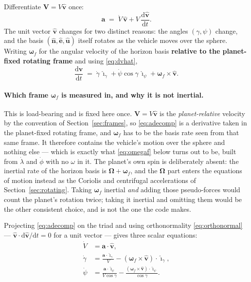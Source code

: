 \documentclass[11pt]{article}
\newcommand{\vhat}{\hat{\mathbf{v}}}
\newcommand{\ig}{\hat{\boldsymbol{\imath}}_{\gamma}}
\newcommand{\ip}{\hat{\boldsymbol{\imath}}_{\psi}}
\newcommand{\nhat}{\hat{\mathbf{n}}}
\newcommand{\ehat}{\hat{\mathbf{e}}}
\newcommand{\uhat}{\hat{\mathbf{u}}}
\newcommand{\bomega}{\boldsymbol{\omega}}
\newcommand{\bOmega}{\boldsymbol{\Omega}}
\newcommand{\dd}{\mathrm{d}}
\begin{document}
Differentiate $\mathbf{V}=V\vhat$ once:
\begin{equation}
  \mathbf{a} \;=\; \dot V\,\vhat + V\,\frac{\dd\vhat}{\dd t} .
  \label{eq:adecomp}
\end{equation}
The unit vector $\vhat$ changes for two distinct reasons: the angles
$(\gamma,\psi)$ change, and the basis $(\nhat,\ehat,\uhat)$ itself rotates as
the vehicle moves over the sphere. Writing $\bomega_f$ for the angular velocity
of the horizon basis \textbf{relative to the planet-fixed rotating frame} and
using \eqref{eq:dvhat},
\begin{equation}
  \frac{\dd\vhat}{\dd t}
  \;=\; \dot\gamma\,\ig + \dot\psi\cos\gamma\,\ip + \bomega_f\times\vhat .
  \label{eq:dvhatdt}
\end{equation}

\paragraph{Which frame $\bomega_f$ is measured in, and why it is not inertial.}
This is load-bearing and is fixed here once. $\mathbf{V} = V\vhat$ is the
\emph{planet-relative} velocity by the convention of
Section~\ref{sec:frames}, so \eqref{eq:adecomp} is a derivative taken in the
planet-fixed rotating frame, and $\bomega_f$ has to be the basis rate seen from
that same frame. It therefore contains the vehicle's motion over the sphere and
nothing else --- which is exactly what \eqref{eq:omegaf} below turns out to be,
built from $\dot\lambda$ and $\dot\phi$ with no $\omega$ in it. The planet's own
spin is deliberately absent: the inertial rate of the horizon basis is
$\bOmega + \bomega_f$, and the $\bOmega$ part enters the equations of motion
instead as the Coriolis and centrifugal accelerations of
Section~\ref{sec:rotating}. Taking $\bomega_f$ inertial \emph{and} adding those
pseudo-forces would count the planet's rotation twice; taking it inertial and
omitting them would be the other consistent choice, and is not the one the code
makes.

Projecting \eqref{eq:adecomp} on the triad and using orthonormality
\eqref{eq:orthonormal} --- $\vhat\cdot\dd\vhat/\dd t = 0$ for a unit vector ---
gives three scalar equations:
\begin{align}
  \dot V      &= \mathbf{a}\cdot\vhat ,                                        \label{eq:Vgen}\\
  \dot\gamma  &= \frac{\mathbf{a}\cdot\ig}{V} - (\bomega_f\times\vhat)\cdot\ig ,\label{eq:gamgen}\\
  \dot\psi    &= \frac{\mathbf{a}\cdot\ip}{V\cos\gamma}
                 - \frac{(\bomega_f\times\vhat)\cdot\ip}{\cos\gamma} .          \label{eq:psigen}
\end{align}
\end{document}
